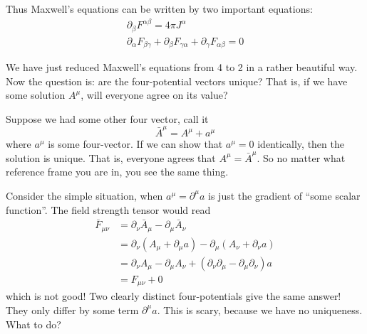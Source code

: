 Thus Maxwell's equations can be written by two important
equations:
\begin{equation}
\boxed{\begin{array}{c}\displaystyle\partial_{\beta}F^{\alpha\beta}=4\pi J^{\alpha}\\
\displaystyle\partial_{\alpha}F_{\beta\gamma}+\partial_{\beta}F_{\gamma\alpha}+\partial_{\gamma}F_{\alpha\beta}=0\end{array}}
\end{equation}

 We have just reduced Maxwell's equations from
4 to 2 in a rather beautiful way. Now the question is: are the
four-potential vectors unique? That is, if we have some solution
$A^{\mu}$, will everyone agree on its value?

Suppose we had some other four vector, call it
\begin{equation}%
\bar{A}^{\mu} = A^{\mu} + a^{\mu}
\end{equation}
where $a^{\mu}$ is some four-vector. If we can show that
$a^{\mu}=0$ identically, then the solution is unique. That is,
everyone agrees that $A^{\mu}=\bar{A}^{\mu}$. So no matter what
reference frame you are in, you see the same thing.

Consider the simple situation, when $a^{\mu}=\partial^{\mu}a$ is
just the gradient of ``some scalar function''. The field strength
tensor would read
\begin{subequations}
\begin{align}
\bar{F}_{\mu\nu}&=\partial_{\nu}\bar{A}_{\mu}-\partial_{\mu}\bar{A}_{\nu}\\
&=\partial_{\nu}(A_{\mu}+\partial_{\mu}a)-\partial_{\mu}(A_{\nu}+\partial_{\nu}a)\\
&=\partial_{\nu}A_{\mu}-\partial_{\mu}A_{\nu}+(\partial_{\nu}\partial_{\mu}-\partial_{\mu}\partial_{\nu})a\\
&=F_{\mu\nu}+0
\end{align}
\end{subequations}
which is not good! Two clearly distinct four-potentials give the
same answer! They only differ by some term
$\partial^{\mu}a$. This is scary, because we have no
uniqueness. What to do?

